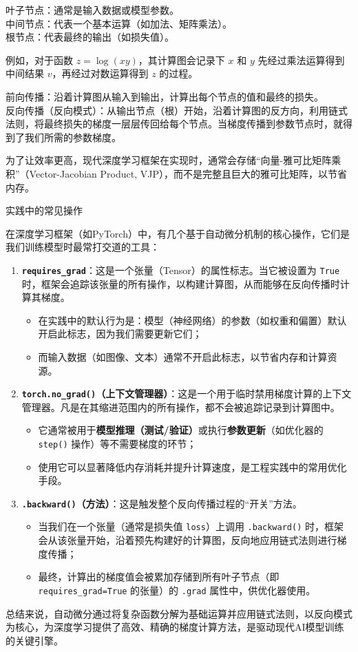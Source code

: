 \documentclass{article}
\begin{document}
{叶子节点：通常是输入数据或模型参数。\\
中间节点：代表一个基本运算（如加法、矩阵乘法）。\\
根节点：代表最终的输出（如损失值）。

例如，对于函数 $z = \log(xy)$，其计算图会记录下 $x$ 和 $y$ 先经过乘法运算得到中间结果 $v$，再经过对数运算得到 $z$ 的过程。

前向传播：沿着计算图从输入到输出，计算出每个节点的值和最终的损失。\\
反向传播（反向模式）：从输出节点（根）开始，沿着计算图的反方向，利用链式法则，将最终损失的梯度一层层传回给每个节点。当梯度传播到参数节点时，就得到了我们所需的参数梯度。

为了让效率更高，现代深度学习框架在实现时，通常会存储“向量-雅可比矩阵乘积”（Vector-Jacobian Product, VJP），而不是完整且巨大的雅可比矩阵，以节省内存。

实践中的常见操作

在深度学习框架（如PyTorch）中，有几个基于自动微分机制的核心操作，它们是我们训练模型时最常打交道的工具：

\begin{enumerate}
\item \textbf{\texttt{requires\_grad}}：这是一个张量（Tensor）的属性标志。当它被设置为 \texttt{True} 时，框架会追踪该张量的所有操作，以构建计算图，从而能够在反向传播时计算其梯度。
\begin{itemize}
\item 在实践中的默认行为是：模型（神经网络）的参数（如权重和偏置）默认开启此标志，因为我们需要更新它们；
\item 而输入数据（如图像、文本）通常不开启此标志，以节省内存和计算资源。
\end{itemize}

\item \textbf{\texttt{torch.no\_grad()}（上下文管理器）}：这是一个用于临时禁用梯度计算的上下文管理器。凡是在其缩进范围内的所有操作，都不会被追踪记录到计算图中。
\begin{itemize}
\item 它通常被用于\textbf{模型推理（测试/验证）}或执行\textbf{参数更新}（如优化器的 \texttt{step()} 操作）等不需要梯度的环节；
\item 使用它可以显著降低内存消耗并提升计算速度，是工程实践中的常用优化手段。
\end{itemize}

\item \textbf{\texttt{.backward()}（方法）}：这是触发整个反向传播过程的“开关”方法。
\begin{itemize}
\item 当我们在一个张量（通常是损失值 \texttt{loss}）上调用 \texttt{.backward()} 时，框架会从该张量开始，沿着预先构建好的计算图，反向地应用链式法则进行梯度传播；
\item 最终，计算出的梯度值会被累加存储到所有叶子节点（即 \texttt{requires\_grad=True} 的张量）的 \texttt{.grad} 属性中，供优化器使用。
\end{itemize}
\end{enumerate}

总结来说，自动微分通过将复杂函数分解为基础运算并应用链式法则，以反向模式为核心，为深度学习提供了高效、精确的梯度计算方法，是驱动现代AI模型训练的关键引擎。

}
\end{document}

